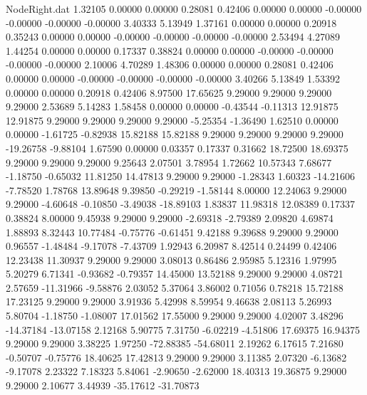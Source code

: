 \begin{filecontents}{NodeRight.dat}
   1.32105    0.00000    0.00000     0.28081    0.42406    0.00000    0.00000   -0.00000   -0.00000   -0.00000   -0.00000    3.40333    5.13949
   1.37161    0.00000    0.00000     0.20918    0.35243    0.00000    0.00000   -0.00000   -0.00000   -0.00000   -0.00000    2.53494    4.27089
   1.44254    0.00000    0.00000     0.17337    0.38824    0.00000    0.00000   -0.00000   -0.00000   -0.00000   -0.00000    2.10006    4.70289
   1.48306    0.00000    0.00000     0.28081    0.42406    0.00000    0.00000   -0.00000   -0.00000   -0.00000   -0.00000    3.40266    5.13849
   1.53392    0.00000    0.00000     0.20918    0.42406    8.97500   17.65625    9.29000    9.29000    9.29000    9.29000    2.53689    5.14283
   1.58458    0.00000    0.00000    -0.43544   -0.11313   12.91875   12.91875    9.29000    9.29000    9.29000    9.29000   -5.25354   -1.36490
   1.62510    0.00000    0.00000    -1.61725   -0.82938   15.82188   15.82188    9.29000    9.29000    9.29000    9.29000  -19.26758   -9.88104
   1.67590    0.00000    0.03357     0.17337    0.31662   18.72500   18.69375    9.29000    9.29000    9.29000    9.25643    2.07501    3.78954
   1.72662   10.57343    7.68677    -1.18750   -0.65032   11.81250   14.47813    9.29000    9.29000   -1.28343    1.60323  -14.21606   -7.78520
   1.78768   13.89648    9.39850    -0.29219   -1.58144    8.00000   12.24063    9.29000    9.29000   -4.60648   -0.10850   -3.49038  -18.89103
   1.83837   11.98318   12.08389     0.17337    0.38824    8.00000    9.45938    9.29000    9.29000   -2.69318   -2.79389    2.09820    4.69874
   1.88893    8.32443   10.77484    -0.75776   -0.61451    9.42188    9.39688    9.29000    9.29000    0.96557   -1.48484   -9.17078   -7.43709
   1.92943    6.20987    8.42514     0.24499    0.42406   12.23438   11.30937    9.29000    9.29000    3.08013    0.86486    2.95985    5.12316
   1.97995    5.20279    6.71341    -0.93682   -0.79357   14.45000   13.52188    9.29000    9.29000    4.08721    2.57659  -11.31966   -9.58876
   2.03052    5.37064    3.86002     0.71056    0.78218   15.72188   17.23125    9.29000    9.29000    3.91936    5.42998    8.59954    9.46638
   2.08113    5.26993    5.80704    -1.18750   -1.08007   17.01562   17.55000    9.29000    9.29000    4.02007    3.48296  -14.37184  -13.07158
   2.12168    5.90775    7.31750    -6.02219   -4.51806   17.69375   16.94375    9.29000    9.29000    3.38225    1.97250  -72.88385  -54.68011
   2.19262    6.17615    7.21680    -0.50707   -0.75776   18.40625   17.42813    9.29000    9.29000    3.11385    2.07320   -6.13682   -9.17078
   2.23322    7.18323    5.84061    -2.90650   -2.62000   18.40313   19.36875    9.29000    9.29000    2.10677    3.44939  -35.17612  -31.70873

\end{filecontents}
